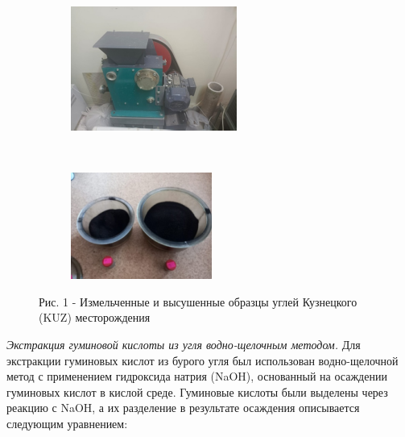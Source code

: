 \begin{figure}[H]
    \centering
    \begin{subfigure}[b]{0.45\textwidth}
        \centering
        \includegraphics[width=\textwidth]{media/gorn3/image2}
    \end{subfigure}
    ~
    \begin{subfigure}[b]{0.45\textwidth}
        \centering
        \includegraphics[width=\textwidth]{media/gorn3/image3}
    \end{subfigure}
    \caption*{Рис. 1 - Измельченные и высушенные образцы углей Кузнецкого (KUZ) месторождения}
\end{figure}

\begin{multicols}{2}
\emph{Экстракция гуминовой кислоты из угля водно-щелочным методом.} Для
экстракции гуминовых кислот из бурого угля был использован
водно-щелочной метод с применением гидроксида натрия (NaOH), основанный
на осаждении гуминовых кислот в кислой среде. Гуминовые кислоты были
выделены через реакцию с NaOH, а их разделение в результате осаждения
описывается следующим уравнением:
\end{multicols}

